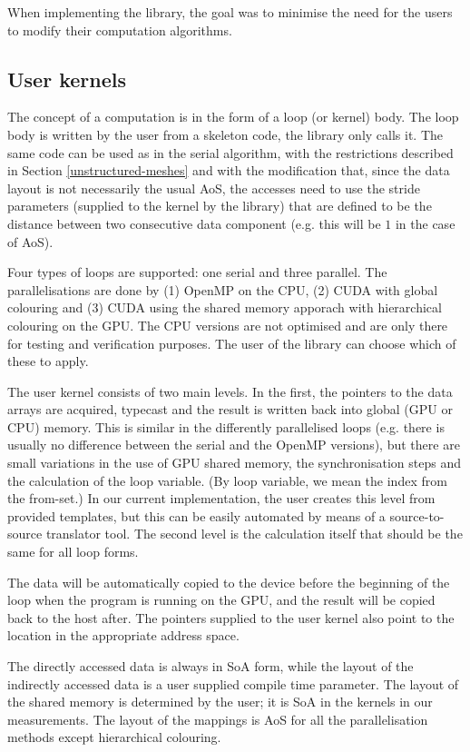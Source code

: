 When implementing the library, the goal was to minimise the need for the users
to modify their computation algorithms.

\subsection{User kernels}

The concept of a computation is in the form of a loop (or kernel) body. The loop
body is written by the user from a skeleton code, the library only calls it. The
same code can be used as in the serial algorithm, with the restrictions
described in Section \ref{unstructured-meshes} and with the modification that,
since the data layout is not necessarily the usual AoS, the accesses need to use
the stride parameters (supplied to the kernel by the library) that are defined
to be the distance between two consecutive data component (e.g. this will be $1$
in the case of AoS).

Four types of loops are supported: one serial and three parallel. The
parallelisations are done by (1) OpenMP on the CPU, (2) CUDA with global
colouring and (3) CUDA using the shared memory apporach with hierarchical
colouring on the GPU. The CPU versions are not optimised and are only there for
testing and verification purposes. The user of the library can choose which of
these to apply.

The user kernel consists of two main levels. In the first, the pointers to the
data arrays are acquired, typecast and the result is written back into global
(GPU or CPU) memory. This is similar in the differently parallelised loops (e.g.
there is usually no difference between the serial and the OpenMP versions), but
there are small variations in the use of GPU shared memory, the synchronisation
steps and the calculation of the loop variable. (By loop variable, we mean the
index from the from-set.) In our current implementation, the user creates this
level from provided templates, but this can be easily automated by means of a
source-to-source translator tool. The second level is the calculation itself
that should be the same for all loop forms.

The data will be automatically copied to the device before the beginning of the
loop when the program is running on the GPU, and the result will be copied back
to the host after. The pointers supplied to the user kernel also point to the
location in the appropriate address space.

The directly accessed data is always in SoA form, while the layout of the
indirectly accessed data is a user supplied compile time parameter. The layout
of the shared memory is determined by the user; it is SoA in the kernels in our
measurements. The layout of the mappings is AoS for all the parallelisation
methods except hierarchical colouring.

